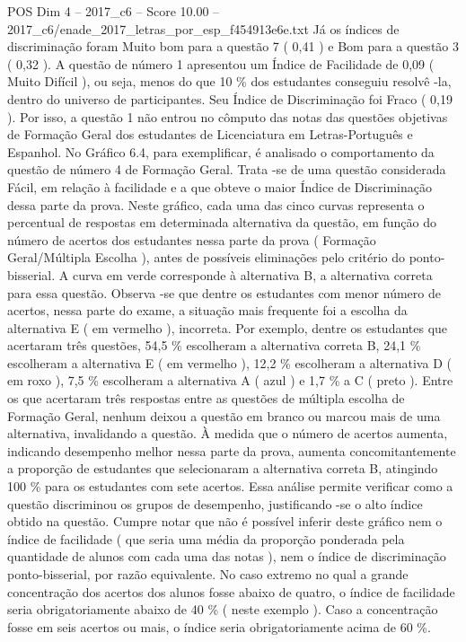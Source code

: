 \begin{textsample}{POS Dim 4 – 2017\_c6 – Score 10.00 – 2017\_c6/enade\_2017\_letras\_por\_esp\_f454913e6e.txt}
Já os índices de discriminação foram Muito bom para a questão 7 ( 0,41 ) e Bom para a questão 3 ( 0,32 ).
A questão de número 1 apresentou um Índice de Facilidade de 0,09 ( Muito Difícil ), ou seja, menos do que 10 \% dos estudantes conseguiu resolvê -la, dentro do universo de participantes.
Seu Índice de Discriminação foi Fraco ( 0,19 ).
Por isso, a questão 1 não entrou no cômputo das notas das questões objetivas de Formação Geral dos estudantes de Licenciatura em Letras-Português e Espanhol.
No Gráfico 6.4, para exemplificar, é analisado o comportamento da questão de número 4 de Formação Geral.
Trata -se de uma questão considerada Fácil, em relação à facilidade e a que obteve o maior Índice de Discriminação dessa parte da prova.
Neste gráfico, cada uma das cinco curvas representa o percentual de respostas em determinada alternativa da questão, em função do número de acertos dos estudantes nessa parte da prova ( Formação Geral/Múltipla Escolha ), antes de possíveis eliminações pelo critério do ponto-bisserial.
A curva em verde corresponde à alternativa B, a alternativa correta para essa questão.
Observa -se que dentre os estudantes com menor número de acertos, nessa parte do exame, a situação mais frequente foi a escolha da alternativa E ( em vermelho ), incorreta.
Por exemplo, dentre os estudantes que acertaram três questões, 54,5 \% escolheram a alternativa correta B, 24,1 \% escolheram a alternativa E ( em vermelho ), 12,2 \% escolheram a alternativa D ( em roxo ), 7,5 \% escolheram a alternativa A ( azul ) e 1,7 \% a C ( preto ).
Entre os que acertaram três respostas entre as questões de múltipla escolha de Formação Geral, nenhum deixou a questão em branco ou marcou mais de uma alternativa, invalidando a questão.
À medida que o número de acertos aumenta, indicando desempenho melhor nessa parte da prova, aumenta concomitantemente a proporção de estudantes que selecionaram a alternativa correta B, atingindo 100 \% para os estudantes com sete acertos.
Essa análise permite verificar como a questão discriminou os grupos de desempenho, justificando -se o alto índice obtido na questão.
Cumpre notar que não é possível inferir deste gráfico nem o índice de facilidade ( que seria uma média da proporção ponderada pela quantidade de alunos com cada uma das notas ), nem o índice de discriminação ponto-bisserial, por razão equivalente.
No caso extremo no qual a grande concentração dos acertos dos alunos fosse abaixo de quatro, o índice de facilidade seria obrigatoriamente abaixo de 40 \% ( neste exemplo ).
Caso a concentração fosse em seis acertos ou mais, o índice seria obrigatoriamente acima de 60 \%.

\end{textsample}
